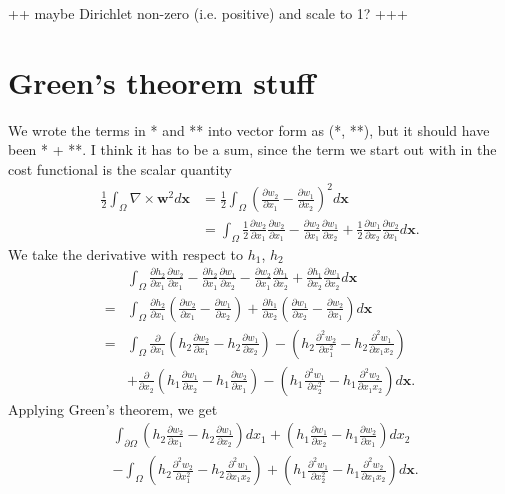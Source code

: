 \documentclass[11pt, a4paper]{article}
\theoremstyle{definition}
\newcommand{\w}{\mathbf{w}}
\newcommand{\x}{\mathbf{x}}
\begin{document}
++ maybe Dirichlet non-zero (i.e. positive) and scale to 1? +++ 	
	\section{Green's theorem stuff}
	We wrote the terms in * and ** into vector form as (*, **), but it should have been * + **. I think it has to be a sum, since the term we start out with in the cost functional is the scalar quantity
	\begin{align*}
		\frac{1}{2} \int_\Omega \nabla \times \w ^2 d\x &= \frac{1}{2} \int_\Omega \left(\frac{\partial w_2}{\partial x_1} - \frac{\partial w_1}{\partial x_2}\right)^2 d\x\\
		&= \int_\Omega \frac{1}{2} \frac{\partial w_2}{\partial x_1}\frac{\partial w_2}{\partial x_1} - \frac{\partial w_2}{\partial x_1}\frac{\partial w_1}{\partial x_2} + \frac{1}{2}\frac{\partial w_1}{\partial x_2}\frac{\partial w_2}{\partial x_1} d\x.
	\end{align*}
	We take the derivative with respect to $h_1$, $h_2$
	\begin{align*}
		&\int_\Omega  \frac{\partial h_2}{\partial x_1}\frac{\partial w_2}{\partial x_1} - \frac{\partial h_2}{\partial x_1}\frac{\partial w_1}{\partial x_2} - \frac{\partial w_2}{\partial x_1}\frac{\partial h_1}{\partial x_2}+ \frac{\partial h_1}{\partial x_2}\frac{\partial w_1}{\partial x_2} d\x \\
		=&\int_\Omega \frac{\partial h_2}{\partial x_1} \left(\frac{\partial w_2}{\partial x_1} - \frac{\partial w_1}{\partial x_2} \right) + \frac{\partial h_1}{\partial x_2}\left(\frac{\partial w_1}{\partial x_2} - \frac{\partial w_2}{\partial x_1} \right) d\x\\
		=& \int_\Omega \frac{\partial}{\partial x_1}\left(h_2\frac{\partial w_2}{\partial x_1} - h_2\frac{\partial w_1}{\partial x_2} \right) - \left(h_2\frac{\partial^2 w_2}{\partial x_1^2} - h_2\frac{\partial^2 w_1}{\partial x_1 x_2} \right)\\
		& + \frac{\partial}{\partial x_2}\left(h_1\frac{\partial w_1}{\partial x_2} - h_1\frac{\partial w_2}{\partial x_1} \right) - \left(h_1\frac{\partial^2 w_1}{\partial x_2^2} - h_1\frac{\partial^2 w_2}{\partial x_1 x_2} \right) d\x.
	\end{align*}
	Applying Green's theorem, we get
	\begin{align*}
		&\int_{\partial \Omega}\left(h_2\frac{\partial w_2}{\partial x_1} - h_2\frac{\partial w_1}{\partial x_2} \right) dx_1 + \left(h_1\frac{\partial w_1}{\partial x_2} - h_1\frac{\partial w_2}{\partial x_1} \right)dx_2\\
		&- \int_\Omega \left(h_2\frac{\partial^2 w_2}{\partial x_1^2} - h_2\frac{\partial^2 w_1}{\partial x_1 x_2} \right) + \left(h_1\frac{\partial^2 w_1}{\partial x_2^2} - h_1\frac{\partial^2 w_2}{\partial x_1 x_2} \right)  d\x.
	\end{align*}
\end{document}
